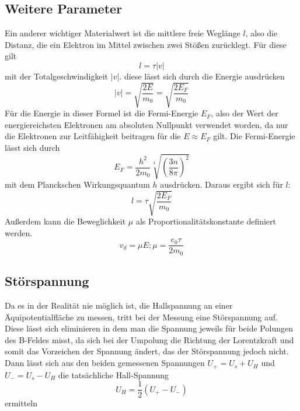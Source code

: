\subsection{Weitere Parameter}
Ein anderer wichtiger Materialwert ist die mittlere freie Weglänge $l$, also die Distanz, die ein Elektron im Mittel zwischen zwei Stößen zurücklegt. Für diese gilt
\begin{equation}
   \label{eq:freieWellenlaenge}
l=\tau \vert v \vert
\end{equation}  
mit der Totalgeschwindigkeit $\vert v \vert$. diese lässt sich durch die Energie ausdrücken
\begin{equation}
   \label{eq:vtot}
\vert v \vert=\sqrt{\frac{2E}{m_0}}=\sqrt{\frac{2E_F}{m_0}}
\end{equation}
Für die Energie in dieser Formel ist die Fermi-Energie $E_F$, also der Wert der energiereichsten Elektronen am absoluten Nullpunkt verwendet worden, da nur die Elektronen zur Leitfähigkeit beitragen für die $E\approx E_F$ gilt. Die Fermi-Energie lässt sich durch
\begin{equation}
E_F=\frac{h^2}{2m_0}\sqrt[3]{(\frac{3n}{8\pi})^2}
\end{equation}
mit dem Planckschen Wirkungsquantum $h$ ausdrücken. Daraus ergibt sich für $l$:
\begin{equation}
   l=\tau\sqrt{\frac{2E_F}{m_0}}
\end{equation}
Außerdem kann die Beweglichkeit $\mu$ als Proportionalitätskonstante definiert werden.
\begin{equation}
   \label{eq:mu}
v_d=\mu E;\mu=\frac{e_0\tau}{2m_0}
\end{equation}
\subsection{Störspannung}
Da es in der Realität nie möglich ist, die Hallspannung an einer Äquipotentialfläche zu messen, tritt bei der Messung eine Störspannung auf. Diese lässt sich eliminieren in dem man die Spannung jeweils für beide Polungen des B-Feldes misst, da sich
bei der Umpolung die Richtung der Lorentzkraft und somit das Vorzeichen der Spannung ändert, das der Störspannung jedoch nicht. Dann lässt sich aus den beiden gemessenen Spannungen $U_+=U_s+U_H$ und $U_-=U_s-U_H$ die tatsächliche Hall-Spannung
\begin{equation}
   \label{eq:hallspannung}
U_H=\frac{1}{2}(U_+-U_-)
\end{equation}
 ermitteln
